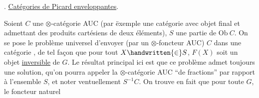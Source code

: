  . \uline{Catégories de Picard enveloppantes}.

Soient $C$ une  $\otimes$-catégorie AUC (par ëxemple une catégorie avec objet final et admettant des produits cartésiens de deux éléments), $S$ une partie de $\mathrm{Ob}\ C$. On se pose le problème universel d'envoyer (par un $\otimes$-foncteur AUC) $C$ dans une \inserted{$\otimes$-}catégorie , de tel façon que pour tout $X\handwritten{\in} S$, $F(X)$ soit un objet \uline{inversible} de $G$. Le résultat principal ici est que ce problème admet toujours une solution, qu'on pourra appeler la $\otimes$-catégorie AUC ``de fractions'' par rapport à l'ensemble $S$, et noter ventuellement $S^{-1}C$. On trouve en fait que pour toute $G$, le foncteur naturel
